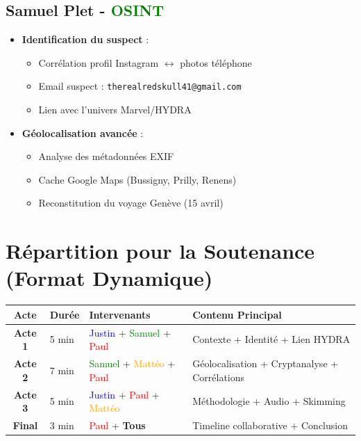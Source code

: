 \documentclass[11pt,a4paper]{article}
\begin{document}
\subsection{Samuel Plet - \textcolor{green}{OSINT}}
\begin{itemize}[leftmargin=*]
    \item \textbf{Identification du suspect} :
    \begin{itemize}
        \item Corrélation profil Instagram $\leftrightarrow$ photos téléphone
        \item Email suspect : \texttt{therealredskull41@gmail.com}
        \item Lien avec l'univers Marvel/HYDRA
    \end{itemize}
    \item \textbf{Géolocalisation avancée} :
    \begin{itemize}
        \item Analyse des métadonnées EXIF
        \item Cache Google Maps (Bussigny, Prilly, Renens)
        \item Reconstitution du voyage Genève (15 avril)
    \end{itemize}
\end{itemize}

\section{Répartition pour la Soutenance (Format Dynamique)}

\begin{table}[h!]
\centering
\begin{tabular}{|c|p{3cm}|p{5cm}|p{4cm}|}
\hline
\textbf{Acte} & \textbf{Durée} & \textbf{Intervenants} & \textbf{Contenu Principal} \\
\hline
\textbf{Acte 1} & 5 min & \textcolor{blue}{Justin} + \textcolor{green}{Samuel} + \textcolor{red}{Paul} & Contexte + Identité + Lien HYDRA \\
\hline
\textbf{Acte 2} & 7 min & \textcolor{green}{Samuel} + \textcolor{orange}{Mattéo} + \textcolor{red}{Paul} & Géolocalisation + Cryptanalyse + Corrélations \\
\hline
\textbf{Acte 3} & 5 min & \textcolor{blue}{Justin} + \textcolor{red}{Paul} + \textcolor{orange}{Mattéo} & Méthodologie + Audio + Skimming \\
\hline
\textbf{Final} & 3 min & \textcolor{red}{Paul} + \textbf{Tous} & Timeline collaborative + Conclusion \\
\hline
\end{tabular}
\end{table}
\end{document}
